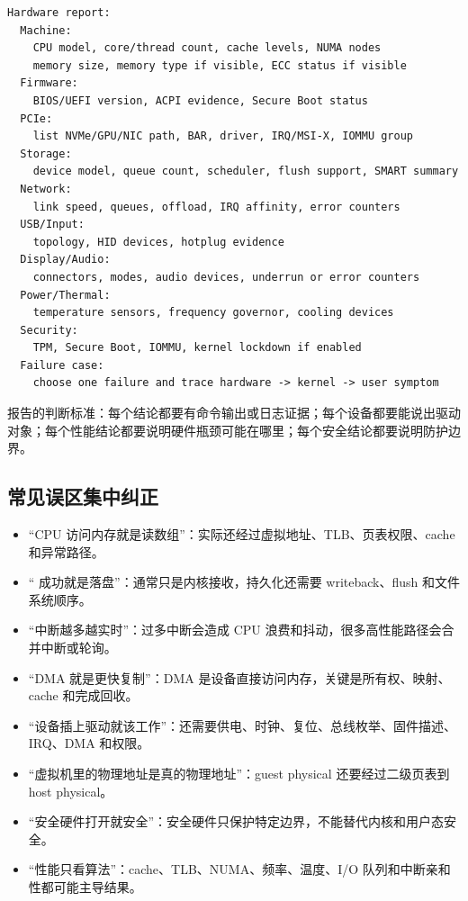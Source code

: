 \begin{lstlisting}
Hardware report:
  Machine:
    CPU model, core/thread count, cache levels, NUMA nodes
    memory size, memory type if visible, ECC status if visible
  Firmware:
    BIOS/UEFI version, ACPI evidence, Secure Boot status
  PCIe:
    list NVMe/GPU/NIC path, BAR, driver, IRQ/MSI-X, IOMMU group
  Storage:
    device model, queue count, scheduler, flush support, SMART summary
  Network:
    link speed, queues, offload, IRQ affinity, error counters
  USB/Input:
    topology, HID devices, hotplug evidence
  Display/Audio:
    connectors, modes, audio devices, underrun or error counters
  Power/Thermal:
    temperature sensors, frequency governor, cooling devices
  Security:
    TPM, Secure Boot, IOMMU, kernel lockdown if enabled
  Failure case:
    choose one failure and trace hardware -> kernel -> user symptom
\end{lstlisting}

报告的判断标准：每个结论都要有命令输出或日志证据；每个设备都要能说出驱动对象；每个性能结论都要说明硬件瓶颈可能在哪里；每个安全结论都要说明防护边界。

\subsection{常见误区集中纠正}

\begin{warningbox}
\begin{itemize}
\tightlist
\item “CPU 访问内存就是读数组”：实际还经过虚拟地址、TLB、页表权限、cache 和异常路径。
\item “ 成功就是落盘”：通常只是内核接收，持久化还需要 writeback、flush 和文件系统顺序。
\item “中断越多越实时”：过多中断会造成 CPU 浪费和抖动，很多高性能路径会合并中断或轮询。
\item “DMA 就是更快复制”：DMA 是设备直接访问内存，关键是所有权、映射、cache 和完成回收。
\item “设备插上驱动就该工作”：还需要供电、时钟、复位、总线枚举、固件描述、IRQ、DMA 和权限。
\item “虚拟机里的物理地址是真的物理地址”：guest physical 还要经过二级页表到 host physical。
\item “安全硬件打开就安全”：安全硬件只保护特定边界，不能替代内核和用户态安全。
\item “性能只看算法”：cache、TLB、NUMA、频率、温度、I/O 队列和中断亲和性都可能主导结果。
\end{itemize}
\end{warningbox}

